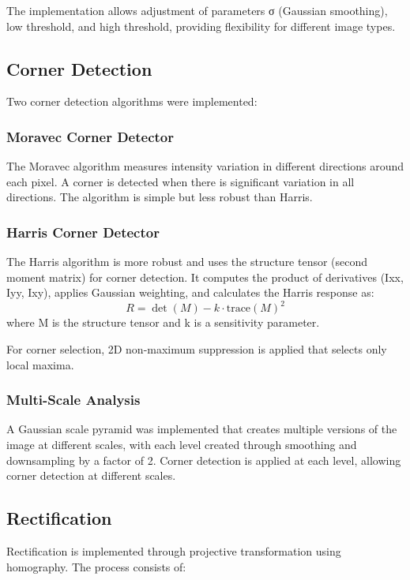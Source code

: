 \documentclass{article}
\begin{document}
The implementation allows adjustment of parameters σ (Gaussian smoothing), low threshold, and high threshold, providing flexibility for different image types.

\subsection{Corner Detection}

Two corner detection algorithms were implemented:

\subsubsection{Moravec Corner Detector}
The Moravec algorithm measures intensity variation in different directions around each pixel. A corner is detected when there is significant variation in all directions. The algorithm is simple but less robust than Harris.

\subsubsection{Harris Corner Detector}
The Harris algorithm is more robust and uses the structure tensor (second moment matrix) for corner detection. It computes the product of derivatives (Ixx, Iyy, Ixy), applies Gaussian weighting, and calculates the Harris response as:
\[
R = \det(M) - k \cdot \text{trace}(M)^2
\]
where M is the structure tensor and k is a sensitivity parameter.

For corner selection, 2D non-maximum suppression is applied that selects only local maxima.

\subsubsection{Multi-Scale Analysis}
A Gaussian scale pyramid was implemented that creates multiple versions of the image at different scales, with each level created through smoothing and downsampling by a factor of 2. Corner detection is applied at each level, allowing corner detection at different scales.

\subsection{Rectification}

Rectification is implemented through projective transformation using homography. The process consists of:
\end{document}
